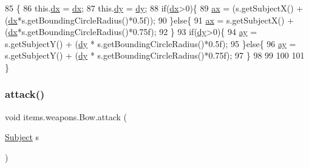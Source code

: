 \begin{DoxyCode}
85                                                       \{
86         this.\mbox{\hyperlink{classitems_1_1weapons_1_1_bow_a5f5ced169bab348188e9b06ac6862a2b}{dx}} = \mbox{\hyperlink{classitems_1_1weapons_1_1_bow_a5f5ced169bab348188e9b06ac6862a2b}{dx}};
87         this.\mbox{\hyperlink{classitems_1_1weapons_1_1_bow_a64b7302a20f953d5940e5063d523d772}{dy}} = \mbox{\hyperlink{classitems_1_1weapons_1_1_bow_a64b7302a20f953d5940e5063d523d772}{dy}};
88         \textcolor{keywordflow}{if}(\mbox{\hyperlink{classitems_1_1weapons_1_1_bow_a5f5ced169bab348188e9b06ac6862a2b}{dx}}>0)\{
89             \mbox{\hyperlink{classitems_1_1weapons_1_1_bow_aff7d073599101d3aaad0f525ef067eac}{ax}} = (s.getSubjectX() + (\mbox{\hyperlink{classitems_1_1weapons_1_1_bow_a5f5ced169bab348188e9b06ac6862a2b}{dx}}*s.getBoundingCircleRadius()*0.5f));
90         \}\textcolor{keywordflow}{else}\{
91             \mbox{\hyperlink{classitems_1_1weapons_1_1_bow_aff7d073599101d3aaad0f525ef067eac}{ax}} = s.getSubjectX() + (\mbox{\hyperlink{classitems_1_1weapons_1_1_bow_a5f5ced169bab348188e9b06ac6862a2b}{dx}}*s.getBoundingCircleRadius()*0.75f);
92         \}
93         \textcolor{keywordflow}{if}(\mbox{\hyperlink{classitems_1_1weapons_1_1_bow_a64b7302a20f953d5940e5063d523d772}{dy}}>0)\{
94             \mbox{\hyperlink{classitems_1_1weapons_1_1_bow_a3180294cbe39f9b47eea37815dc1c4f6}{ay}} = s.getSubjectY() + (\mbox{\hyperlink{classitems_1_1weapons_1_1_bow_a64b7302a20f953d5940e5063d523d772}{dy}} * s.getBoundingCircleRadius()*0.5f);
95         \}\textcolor{keywordflow}{else}\{
96             \mbox{\hyperlink{classitems_1_1weapons_1_1_bow_a3180294cbe39f9b47eea37815dc1c4f6}{ay}} = s.getSubjectY() + (\mbox{\hyperlink{classitems_1_1weapons_1_1_bow_a64b7302a20f953d5940e5063d523d772}{dy}} * s.getBoundingCircleRadius()*0.75f);
97         \}
98         
99         
100         
101     \}
\end{DoxyCode}
\mbox{\label{classitems_1_1weapons_1_1_bow_a426f622db5ad46a8f49487a95b57c94f}} 
\subsubsection{\texorpdfstring{attack()}{attack()}}
{\footnotesize\ttfamily void items.\+weapons.\+Bow.\+attack (\begin{DoxyParamCaption}\item[{\mbox{\hyperlink{classentities_1_1_subject}{Subject}}}]{s }\end{DoxyParamCaption})\hspace{0.3cm}{\ttfamily [inline]}}


